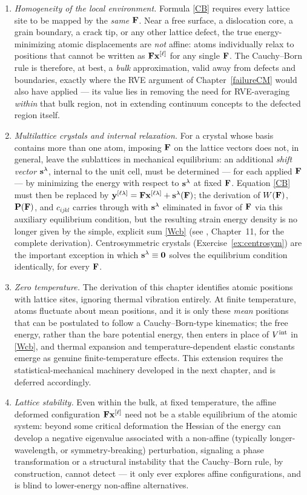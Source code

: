 \begin{enumerate}
	\item \textit{Homogeneity of the local environment.} Formula \eqref{CB} requires every lattice site to be mapped by the \textit{same} $\Fb$. Near a free surface, a dislocation core, a grain boundary, a crack tip, or any other lattice defect, the true energy-minimizing atomic displacements are \textit{not} affine: atoms individually relax to positions that cannot be written as $\Fb\xb^{[\ell]}$ for any single $\Fb$. The Cauchy--Born rule is therefore, at best, a \textit{bulk} approximation, valid away from defects and boundaries, exactly where the RVE argument of Chapter~\ref{failureCM} would also have applied --- its value lies in removing the need for RVE-averaging \textit{within} that bulk region, not in extending continuum concepts to the defected region itself.
	\item \textit{Multilattice crystals and internal relaxation.} For a crystal whose basis contains more than one atom, imposing $\Fb$ on the lattice vectors does not, in general, leave the sublattices in mechanical equilibrium: an additional \textit{shift vector} $\sb^\lambda$, internal to the unit cell, must be determined --- for each applied $\Fb$ --- by minimizing the energy with respect to $\sb^\lambda$ at fixed $\Fb$. Equation \eqref{CB} must then be replaced by $\yb^{[\ell\lambda]} = \Fb\xb^{[\ell\lambda]}+\sb^\lambda(\Fb)$; the derivation of $W(\Fb)$, $\Pb(\Fb)$, and $c_{ijkl}$ carries through with $\sb^\lambda$ eliminated in favor of $\Fb$ via this auxiliary equilibrium condition, but the resulting strain energy density is no longer given by the simple, explicit sum \eqref{Wcb} (see \cite{TadmorMiller}, Chapter~11, for the complete derivation). Centrosymmetric crystals (Exercise~\ref{ex:centrosym}) are the important exception in which $\sb^\lambda\equiv\bf 0$ solves the equilibrium condition identically, for every $\Fb$.
	\item \textit{Zero temperature.} The derivation of this chapter identifies atomic positions with lattice sites, ignoring thermal vibration entirely. At finite temperature, atoms fluctuate about mean positions, and it is only these \textit{mean} positions that can be postulated to follow a Cauchy--Born-type kinematics; the free energy, rather than the bare potential energy, then enters in place of $V^{\rm int}$ in \eqref{Wcb}, and thermal expansion and temperature-dependent elastic constants emerge as genuine finite-temperature effects. This extension requires the statistical-mechanical machinery developed in the next chapter, and is deferred accordingly.
	\item \textit{Lattice stability.} Even within the bulk, at fixed temperature, the affine deformed configuration $\Fb\xb^{[\ell]}$ need not be a stable equilibrium of the atomic system: beyond some critical deformation the Hessian of the energy can develop a negative eigenvalue associated with a non-affine (typically longer-wavelength, or symmetry-breaking) perturbation, signaling a phase transformation or a structural instability that the Cauchy--Born rule, by construction, cannot detect --- it only ever explores affine configurations, and is blind to lower-energy non-affine alternatives.
\end{enumerate}

